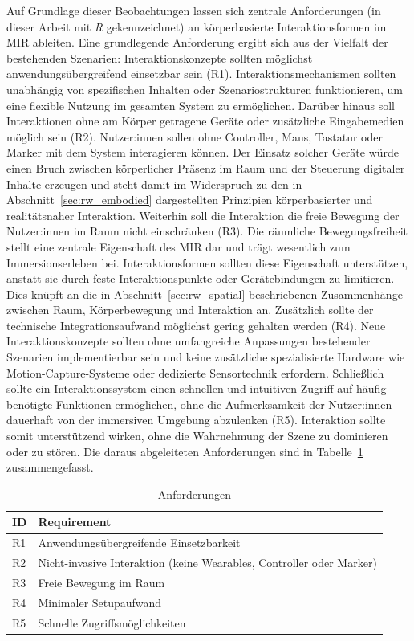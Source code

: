 Auf Grundlage dieser Beobachtungen lassen sich zentrale Anforderungen (in dieser Arbeit mit \textit{R} gekennzeichnet) an körper\-basierte Interaktionsformen im MIR ableiten. Eine grundlegende Anforderung ergibt sich aus der Vielfalt der bestehenden Szenarien: Interaktionskonzepte sollten möglichst anwendungsübergreifend einsetzbar sein (R1). Interaktionsmechanismen sollten unabhängig von spezifischen Inhalten oder Szenariostrukturen funktionieren, um eine flexible Nutzung im gesamten System zu ermög\-lichen.
Darüber hinaus soll Interaktionen ohne am Körper getragene Geräte oder zusätzliche Eingabemedien möglich sein (R2). Nutzer:innen sollen ohne Controller, Maus, Tastatur oder Marker mit dem System interagieren können. Der Einsatz solcher Geräte würde einen Bruch zwischen körperlicher Präsenz im Raum und der Steuerung digitaler Inhalte erzeugen und steht damit im Widerspruch zu den in Abschnitt~\ref{sec:rw_embodied} dargestellten Prinzipien körper\-basierter und realitätsnaher Interaktion.
Weiterhin soll die Interaktion die freie Bewegung der Nutzer:innen im Raum nicht einschränken (R3). Die räumliche Bewegungsfreiheit stellt eine zentrale Eigenschaft des MIR dar und trägt wesentlich zum Immersionserleben bei. Interaktionsformen sollten diese Eigenschaft unterstützen, anstatt sie durch feste Interaktionspunkte oder Gerätebindungen zu limitieren. Dies knüpft an die in Abschnitt~\ref{sec:rw_spatial} beschriebenen Zusammenhänge zwischen Raum, Körperbewegung und Interaktion an.
Zusätzlich sollte der technische Integrationsaufwand möglichst gering gehalten werden (R4). Neue Interaktionskonzepte sollten ohne umfangreiche Anpassungen bestehender Szenarien implementierbar sein und keine zusätzliche spezialisierte Hardware wie Motion-Capture-Systeme oder dedizierte Sensortechnik erfordern.
Schließlich sollte ein Interaktionssystem einen schnellen und intuitiven Zugriff auf häufig benötigte Funktionen ermög\-lichen, ohne die Aufmerksamkeit der Nutzer:innen dauerhaft von der immersiven Umgebung abzulenken (R5). Interaktion sollte somit unterstützend wirken, ohne die Wahrnehmung der Szene zu dominieren oder zu stören.
Die daraus abgeleiteten Anforderungen sind in Tabelle~\ref{tab:requirements} zusammengefasst.

\begin{table}[htbp]
\centering
\begin{tabular}{ll}
\toprule
ID & Requirement \\
\midrule
R1 & Anwendungsübergreifende Einsetzbarkeit \\
R2 & Nicht-invasive Interaktion (keine Wearables, Controller oder Marker) \\
R3 & Freie Bewegung im Raum \\
R4 & Minimaler Setupaufwand \\
R5 & Schnelle Zugriffsmöglichkeiten \\
\bottomrule
\end{tabular}
\caption{Anforderungen}
\label{tab:requirements}
\end{table}

